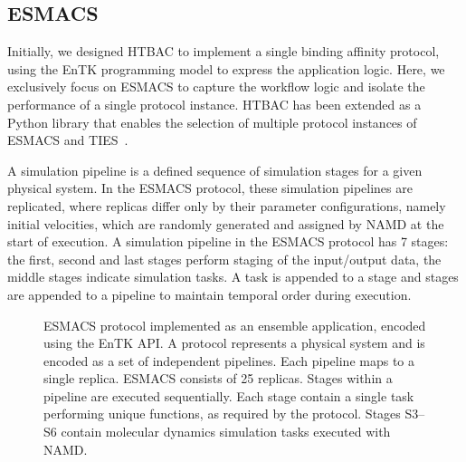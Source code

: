 \subsection{ESMACS}\label{sec:htbac}

Initially, we designed HTBAC to implement a single binding affinity protocol,
using the EnTK programming model to express the application logic. Here, we
exclusively focus on ESMACS to capture the workflow logic and isolate the
performance of a single protocol instance. HTBAC has been extended as a
Python library that enables the selection of multiple protocol instances of
ESMACS and TIES~\cite{dakka}.

A simulation pipeline is a defined sequence of simulation stages for a given
physical system. In the ESMACS protocol, these simulation pipelines are
replicated, where replicas differ only by their parameter configurations,
namely initial velocities, which are randomly generated and assigned by NAMD
at the start of execution. A simulation pipeline in the ESMACS protocol has 7
stages: the first, second and last stages perform staging of the input/output
data, the middle stages indicate simulation tasks. A task is appended to a
stage and stages are appended to a pipeline to maintain temporal order during
execution.


\begin{figure}[h!]
\caption{
  ESMACS protocol implemented as an ensemble application, encoded
  using the EnTK API\@. A protocol represents a physical system and is
  encoded as a set of independent pipelines. Each pipeline maps to a single
  replica. ESMACS consists of 25 replicas. Stages within a pipeline are
  executed sequentially. Each stage contain a single task performing unique
  functions, as required by the protocol. Stages S3--S6 contain molecular
  dynamics simulation tasks executed with NAMD\@.}
  \label{figure:HTBAC}
  \end{figure}



